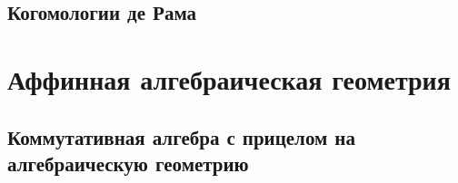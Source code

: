 \documentclass[dvipsnames, 11pt]{book}
\begin{document}
    \section{Когомологии де Рама}

    
    
    
    
    
    
    
    



    \chapter{Аффинная алгебраическая геометрия }
    \section{Коммутативная алгебра с прицелом на алгебраическую геометрию}


    
    
    
    
    
    
    

    
    
        
    
    
    
    
    
    
    
\end{document}
